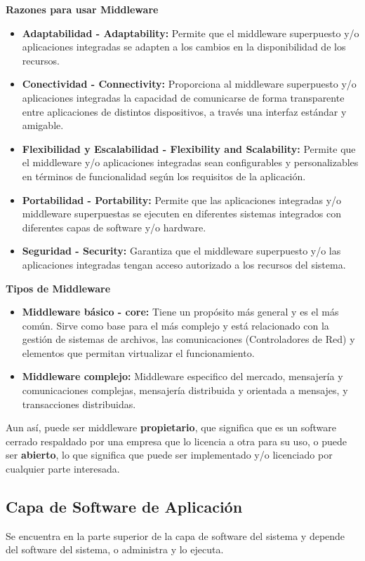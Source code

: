 \documentclass[12pt]{report} %
\begin{document}
\textbf{Razones para usar Middleware}
\begin{itemize}
	\item \textbf{Adaptabilidad - Adaptability:} Permite que el middleware superpuesto y/o aplicaciones integradas se adapten a los cambios en la disponibilidad de los recursos.
	\item \textbf{Conectividad - Connectivity:} Proporciona al middleware superpuesto y/o aplicaciones integradas la capacidad de comunicarse de forma transparente entre aplicaciones de distintos dispositivos, a través una interfaz estándar y amigable.
	\item \textbf{Flexibilidad y Escalabilidad - Flexibility and Scalability:} Permite que el middleware y/o aplicaciones integradas sean configurables y personalizables en términos de funcionalidad según los requisitos de la aplicación.
	\item \textbf{Portabilidad - Portability:} Permite que las aplicaciones integradas y/o middleware superpuestas se ejecuten en diferentes sistemas integrados con diferentes capas de software y/o hardware.
	\item \textbf{Seguridad - Security:} Garantiza que el middleware superpuesto y/o las aplicaciones integradas tengan acceso autorizado a los recursos del sistema.
\end{itemize}

\textbf{Tipos de Middleware}
\begin{itemize}
	\item \textbf{Middleware básico - core:} Tiene un propósito más general y es el más común. Sirve como base para el más complejo y está relacionado con la gestión de sistemas de archivos, las comunicaciones (Controladores de Red) y elementos que permitan virtualizar el funcionamiento.
	\item \textbf{Middleware complejo:} Middleware especifico del mercado, mensajería y comunicaciones complejas, mensajería distribuida y orientada a mensajes, y transacciones distribuidas.
\end{itemize}

Aun así, puede ser middleware \textbf{propietario}, que significa que es un software cerrado respaldado por una empresa que lo licencia a otra para su uso, o puede ser \textbf{abierto}, lo que significa que puede ser implementado y/o licenciado por cualquier parte interesada.

\subsection{Capa de Software de Aplicación}
Se encuentra en la parte superior de la capa de software del sistema y depende del software del sistema, o administra y lo ejecuta. 
\end{document}
